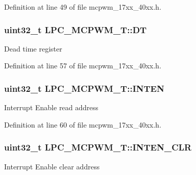 Definition at line 49 of file mcpwm\+\_\+17xx\+\_\+40xx.\+h.

\subsubsection[{\texorpdfstring{DT}{DT}}]{ uint32\+\_\+t L\+P\+C\+\_\+\+M\+C\+P\+W\+M\+\_\+\+T\+::\+DT}\hypertarget{structLPC__MCPWM__T_a15d8f4f81c3e82a335d4abb02863b850}{}\label{structLPC__MCPWM__T_a15d8f4f81c3e82a335d4abb02863b850}
Dead time register 

Definition at line 57 of file mcpwm\+\_\+17xx\+\_\+40xx.\+h.

\subsubsection[{\texorpdfstring{I\+N\+T\+EN}{INTEN}}]{ uint32\+\_\+t L\+P\+C\+\_\+\+M\+C\+P\+W\+M\+\_\+\+T\+::\+I\+N\+T\+EN}\hypertarget{structLPC__MCPWM__T_a2f6d65b7d9772a735474d90311e738b6}{}\label{structLPC__MCPWM__T_a2f6d65b7d9772a735474d90311e738b6}
Interrupt Enable read address 

Definition at line 60 of file mcpwm\+\_\+17xx\+\_\+40xx.\+h.

\subsubsection[{\texorpdfstring{I\+N\+T\+E\+N\+\_\+\+C\+LR}{INTEN_CLR}}]{ uint32\+\_\+t L\+P\+C\+\_\+\+M\+C\+P\+W\+M\+\_\+\+T\+::\+I\+N\+T\+E\+N\+\_\+\+C\+LR}\hypertarget{structLPC__MCPWM__T_a5694122ceacd913b57424a90be8f7f63}{}\label{structLPC__MCPWM__T_a5694122ceacd913b57424a90be8f7f63}
Interrupt Enable clear address 

